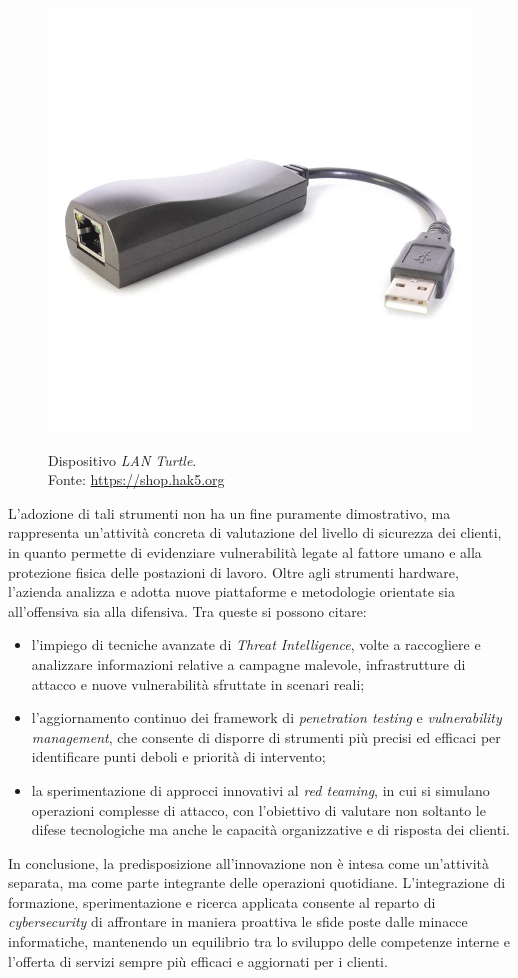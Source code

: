 \begin{itemize}
\begin{figure}[H]
    \includegraphics[alt={LAN Turtle}, width=0.8\columnwidth]{img/lan-turtle_2000x.jpg}
    \caption{Dispositivo \textit{LAN Turtle}.\\ Fonte: \url{https://shop.hak5.org}}
    \label{fig:lan-turtle}
    \end{figure}
\end{itemize}
L'adozione di tali strumenti non ha un fine puramente dimostrativo, ma rappresenta un'attività concreta di valutazione del livello di sicurezza dei clienti, in quanto permette di evidenziare vulnerabilità legate al fattore umano e alla protezione fisica delle postazioni di lavoro.  
Oltre agli strumenti hardware, l'azienda analizza e adotta nuove piattaforme e metodologie orientate sia all'offensiva sia alla difensiva. Tra queste si possono citare:
\begin{itemize}
    \item l'impiego di tecniche avanzate di \textit{Threat Intelligence}, volte a raccogliere e analizzare informazioni relative a campagne malevole, infrastrutture di attacco e nuove vulnerabilità sfruttate in scenari reali;
    \item l'aggiornamento continuo dei framework di \textit{penetration testing} e \textit{vulnerability management}, che consente di disporre di strumenti più precisi ed efficaci per identificare punti deboli e priorità di intervento;
    \item la sperimentazione di approcci innovativi al \textit{red teaming}, in cui si simulano operazioni complesse di attacco, con l'obiettivo di valutare non soltanto le difese tecnologiche ma anche le capacità organizzative e di risposta dei clienti.
\end{itemize}
In conclusione, la predisposizione all'innovazione non è intesa come un'attività separata, ma come parte integrante delle operazioni quotidiane. L'integrazione di formazione, sperimentazione e ricerca applicata consente al reparto di \textit{cybersecurity} di affrontare in maniera proattiva le sfide poste dalle minacce informatiche, mantenendo un equilibrio tra lo sviluppo delle competenze interne e l'offerta di servizi sempre più efficaci e aggiornati per i clienti.
